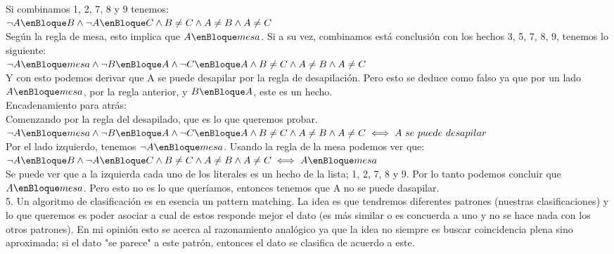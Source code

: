 Si combinamos 1, 2, 7, 8 y 9 tenemos: \\

$\neg A \enBloque B \wedge \neg A \enBloque C \wedge B \neq C \wedge A \neq B \wedge A \neq C$ \\

Según la regla de mesa, esto implica que $A \enBloque mesa$. Si a su vez, combinamos está conclusión con los hechos 3, 5, 7, 8, 9, tenemos lo siguiente:\\ 

$\neg A \enBloque mesa \wedge \neg B \enBloque A \wedge \neg C \enBloque A \wedge B \neq C \wedge A \neq B \wedge A \neq C$ \\

Y con esto podemos derivar que A se puede desapilar por la regla de desapilación. Pero esto se deduce como falso ya que por un lado $A \enBloque mesa$, por la regla anterior, y $B \enBloque A$, este es un hecho.\\

Encadenamiento para atrás: \\

Comenzando por la regla del desapilado, que es lo que queremos probar. \\ 

$\neg A \enBloque mesa \wedge \neg B \enBloque A \wedge \neg C \enBloque A \wedge B \neq C \wedge A \neq B \wedge A \neq C \iff A\ se\ puede\ desapilar$ \\

Por el lado izquierdo, tenemos $\neg A \enBloque mesa$. Usando la regla de la mesa podemos ver que: \\

$\neg A \enBloque B \wedge \neg A \enBloque C \wedge B \neq C \wedge A \neq B \wedge A \neq C \iff A \enBloque mesa$ \\

Se puede ver que a la izquierda cada uno de los literales es un hecho de la lista; 1, 2, 7, 8 y 9. Por lo tanto podemos concluir que $A \enBloque mesa$. Pero esto no es lo que queríamos, entonces tenemos que A no se puede dasapilar.\\


5. Un algoritmo de clasificación es en esencia un pattern matching. La idea es que tendremos diferentes patrones (nuestras clasificaciones) y lo que queremos es poder asociar a cual de estos responde mejor el dato (es más similar o es concuerda a uno y no se hace nada con los otros patrones). En mi opinión esto se acerca al razonamiento analógico ya que la idea no siempre es buscar coincidencia plena sino aproximada; si el dato "se parece" a este patrón, entonces el dato se clasifica de acuerdo a este. \\

